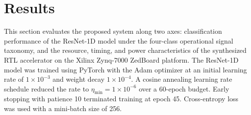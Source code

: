 \documentclass[conference]{IEEEtran}
\begin{document}
\section{Results}
This section evaluates the proposed system along two axes: classification performance of the ResNet-1D model under the four-class operational signal taxonomy, and the resource, timing, and power characteristics of the synthesized RTL accelerator on the Xilinx Zynq-7000 ZedBoard platform.
The ResNet-1D model was trained using PyTorch with the Adam optimizer \cite{b13} at an initial learning rate of $1 \times 10^{-3}$ and weight decay $1 \times 10^{-4}$. A cosine annealing learning rate schedule reduced the rate to $\eta_{\min} = 1 \times 10^{-6}$ over a 60-epoch budget. Early stopping with patience 10 terminated training at epoch 45. Cross-entropy loss was used with a mini-batch size of 256.
\end{document}
